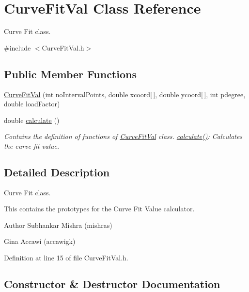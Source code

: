 \hypertarget{class_curve_fit_val}{}\section{Curve\+Fit\+Val Class Reference}
\label{class_curve_fit_val}


Curve Fit class.  




{\ttfamily \#include $<$Curve\+Fit\+Val.\+h$>$}

\subsection*{Public Member Functions}
\begin{DoxyCompactItemize}
\item 
\hyperlink{class_curve_fit_val_a3f15488dbd91b1e4b8c950071402811c}{Curve\+Fit\+Val} (int no\+Interval\+Points, double xcoord\mbox{[}$\,$\mbox{]}, double ycoord\mbox{[}$\,$\mbox{]}, int pdegree, double load\+Factor)
\item 
double \hyperlink{class_curve_fit_val_ab4692d5c52b77dc03caf7b45f6377ba8}{calculate} ()
\begin{DoxyCompactList}\small\item\em Contains the definition of functions of \hyperlink{class_curve_fit_val}{Curve\+Fit\+Val} class. \hyperlink{class_curve_fit_val_ab4692d5c52b77dc03caf7b45f6377ba8}{calculate()}\+: Calculates the curve fit value. \end{DoxyCompactList}\end{DoxyCompactItemize}


\subsection{Detailed Description}
Curve Fit class. 

This contains the prototypes for the Curve Fit Value calculator.

\begin{DoxyAuthor}{Author}
Subhankar Mishra (mishras) 

Gina Accawi (accawigk) 
\end{DoxyAuthor}


Definition at line 15 of file Curve\+Fit\+Val.\+h.



\subsection{Constructor \& Destructor Documentation}
\mbox{\label{class_curve_fit_val_a3f15488dbd91b1e4b8c950071402811c}} 
